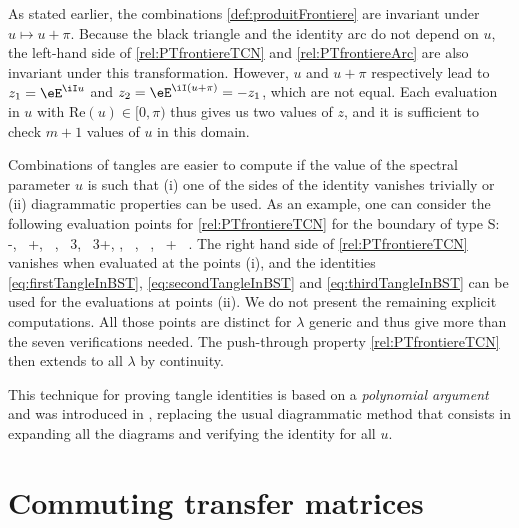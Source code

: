 \documentclass[11pt]{article}
\numberwithin{equation}{section}
\theoremstyle{alexi}
\begin{document}
As stated earlier, the combinations \eqref{def:produitFrontiere} are invariant under $u\mapsto u+\pi$. Because the black triangle and the identity arc do not depend on $u$, the left-hand side of \eqref{rel:PTfrontiereTCN} and \eqref{rel:PTfrontiereArc} are also invariant under this transformation. However, $u$ and $u+\pi$ respectively lead to $z_1=\eE^{\iI u}$ and $z_2=\eE^{\iI(u+\pi)}=-z_1$, which are not equal. Each evaluation in $u$ with $\textrm{Re}(u) \in [0,\pi)$ thus gives us two values of $z$, and it is sufficient to check $m+1$ values of $u$ in this domain.  

Combinations of tangles are easier to compute if the value of the spectral parameter $u$ is such that (i) one of the sides of the identity vanishes trivially or (ii) diagrammatic properties can be used. As an example, one can consider the following evaluation points for \eqref{rel:PTfrontiereTCN} for the boundary of type S:
\be 
{}\quad -, \, +, \, ,
\, 3\lambda, \, 3\lambda+, 
\qquad \qquad
{}\quad {}, \, , \,
\lambda, \, \lambda+ \ .
\ee
The right hand side of \eqref{rel:PTfrontiereTCN} vanishes when evaluated at the points (i), and the identities \eqref{eq:firstTangleInBST}, \eqref{eq:secondTangleInBST} and \eqref{eq:thirdTangleInBST} can be used for the evaluations at points (ii). We do not present the remaining explicit computations. All those points are distinct for $\lambda$ generic and thus give more than the seven verifications needed. The push-through property \eqref{rel:PTfrontiereTCN} then extends to all $\lambda$ by continuity.

This technique for proving tangle identities is based on a {\em polynomial argument} and was introduced in \cite{AMDPP19}, replacing the usual diagrammatic method that consists in expanding all the diagrams and verifying the identity for all $u$. 

%
\section{Commuting transfer matrices}\label{sec:transferMatrices}
%
\end{document}
